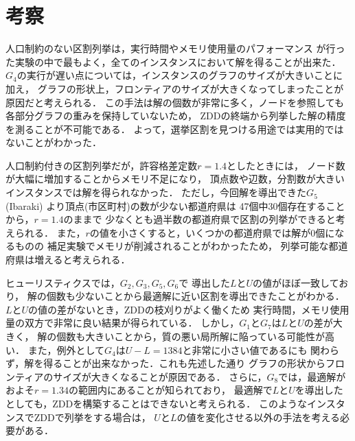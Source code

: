 \section{考察}

人口制約のない区割列挙は，実行時間やメモリ使用量のパフォーマンス
が行った実験の中で最もよく，全てのインスタンスにおいて解を得ることが出来た．
$G_4$の実行が遅い点については，インスタンスのグラフのサイズが大きいことに加え，
グラフの形状上，フロンティアのサイズが大きくなってしまったことが原因だと考えられる．
この手法は解の個数が非常に多く，ノードを参照しても各部分グラフの重みを保持していないため，
ZDDの終端から列挙した解の精度を測ることが不可能である．
よって，選挙区割を見つける用途では実用的ではないことがわかった．

人口制約付きの区割列挙だが，許容格差定数$r=1.4$としたときには，
ノード数が大幅に増加することからメモリ不足になり，
頂点数や辺数，分割数が大きいインスタンスでは解を得られなかった．
ただし，今回解を導出できた$G_5$(Ibaraki) より頂点(市区町村)の数が少ない都道府県は
47個中30個存在することから，$r=1.4$のままで
少なくとも過半数の都道府県で区割の列挙ができると考えられる．
また，$r$の値を小さくすると，いくつかの都道府県では解が0個になるものの
補足実験でメモリが削減されることがわかったため，
列挙可能な都道府県は増えると考えられる．

ヒューリスティクスでは，$G_2, G_3, G_5, G_6$で
導出した$L$と$U$の値がほぼ一致しており，
解の個数も少ないことから最適解に近い区割を導出できたことがわかる．
$L$と$U$の値の差がないとき，ZDDの枝刈りがよく働くため
実行時間，メモリ使用量の双方で非常に良い結果が得られている．
しかし，$G_1$と$G_7$は$L$と$U$の差が大きく，
解の個数も大きいことから，質の悪い局所解に陥っている可能性が高い．
また，例外として$G_4$は$U-L=1384$と非常に小さい値であるにも
関わらず，解を得ることが出来なかった．これも先述した通り
グラフの形状からフロンティアのサイズが大きくなることが原因である．
さらに，$G_8$では，最適解がおよそ$r=1.34$の範囲内にあることが知られており，
最適解で$L$と$U$を導出したとしても，ZDDを構築することはできないと考えられる．
このようなインスタンスでZDDで列挙をする場合は，
$U$と$L$の値を変化させる以外の手法を考える必要がある．
